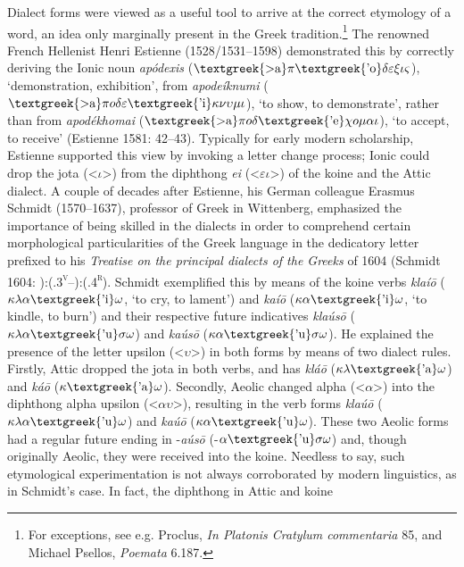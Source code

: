 \documentclass[12pt]{article}
\makeatletter
\newcommand\textstyleFootnoteSymbol[1]{\textsuperscript{#1}}
\renewcommand\subsubsection{\@startsection{subsubsection}{3}{0.1972in}{0.028in}{0.028in}{\normalfont\normalsize\fontsize{12pt}{14.4pt}\selectfont\rmfamily\itshape}}
\newenvironment{styleStandard}{\renewcommand\baselinestretch{1.25}\setlength\leftskip{0in}\setlength\rightskip{0in}\setlength\parindent{0.1972in}\setlength\parfillskip{0pt plus 1fil}\setlength\parskip{0in plus 1pt}\writerlistparindent\writerlistleftskip\leavevmode\normalfont\normalsize\writerlistlabel\ignorespaces}{\unskip\vspace{0in plus 1pt}\par}
\newcommand\writerlistleftskip{}
\newcommand\writerlistparindent{}
\newcommand\writerlistlabel{}
\makeatother
\begin{document}
\subsubsection{Etymology}
\hypertarget{Toc19704821}{}\begin{styleStandard}
Dialect forms were viewed as a useful tool to arrive at the correct etymology of a word, an idea only marginally present in the Greek tradition.\footnote{ For exceptions, see e.g. Proclus, \textit{In Platonis Cratylum commentaria} 85, and Michael Psellos,\textit{ Poemata} 6.187.} The renowned French Hellenist Henri Estienne (1528/1531–1598) demonstrated this by correctly deriving the Ionic noun \textit{apódexis }($\text{\textgreek{>a}}\pi \text{\textgreek{'o}}\delta \varepsilon \xi \iota \varsigma $), ‘demonstration, exhibition’, from \textit{apodeíknumi }($\text{\textgreek{>a}}\pi o\delta \varepsilon \text{\textgreek{'i}}\kappa \nu \upsilon \mu \iota $), ‘to show, to demonstrate’, rather than from \textit{apodékhomai} ($\text{\textgreek{>a}}\pi o\delta \text{\textgreek{'e}}\chi o\mu \alpha \iota $), ‘to accept, to receive’ (Estienne 1581: 42–43). Typically for early modern scholarship, Estienne supported this view by invoking a letter change process; Ionic could drop the jota ({\textless}$\iota ${\textgreater}) from the diphthong \textit{ei} ({\textless}$\varepsilon \iota ${\textgreater}) of the koine and the Attic dialect. A couple of decades after Estienne, his German colleague Erasmus Schmidt (1570–1637), professor of Greek in Wittenberg, emphasized the importance of being skilled in the dialects in order to comprehend certain morphological particularities of the Greek language in the dedicatory letter prefixed to his \textit{Treatise on the principal dialects of the Greeks} of 1604 (Schmidt 1604: ):(.3\textsc{\textsuperscript{v}}–):(.4\textsc{\textsuperscript{r}}). Schmidt exemplified this by means of the koine verbs \textit{klaí\=o }($\kappa \lambda \alpha \text{\textgreek{'i}}\omega $, ‘to cry, to lament’) and \textit{kaí\=o} ($\kappa \alpha \text{\textgreek{'i}}\omega $, ‘to kindle, to burn’) and their respective future indicatives \textit{klaús\=o} ($\kappa \lambda \alpha \text{\textgreek{'u}}\sigma \omega $) and \textit{kaús\=o} ($\kappa \alpha \text{\textgreek{'u}}\sigma \omega $). He explained the presence of the letter upsilon ({\textless}$\upsilon ${\textgreater}) in both forms by means of two dialect rules. Firstly, Attic dropped the jota in both verbs, and has \textit{klá\=o} ($\kappa \lambda \text{\textgreek{'a}}\omega $) and \textit{ká\=o} ($\kappa \text{\textgreek{'a}}\omega $). Secondly, Aeolic changed alpha ({\textless}$\alpha ${\textgreater}) into the diphthong alpha upsilon ({\textless}$\alpha \upsilon ${\textgreater}), resulting in the verb forms \textit{klaú\=o} ($\kappa \lambda \alpha \text{\textgreek{'u}}\omega $) and \textit{kaú\=o} ($\kappa \alpha \text{\textgreek{'u}}\omega $). These two Aeolic forms had a regular future ending in -\textit{aús\=o} (-$\alpha \text{\textgreek{'u}}\sigma \omega $) and, though originally Aeolic, they were received into the koine. Needless to say, such etymological experimentation is not always corroborated by modern linguistics, as in Schmidt’s case.\textstyleFootnoteSymbol{ }In fact, the diphthong in Attic and koine 
\end{styleStandard}
\end{document}
